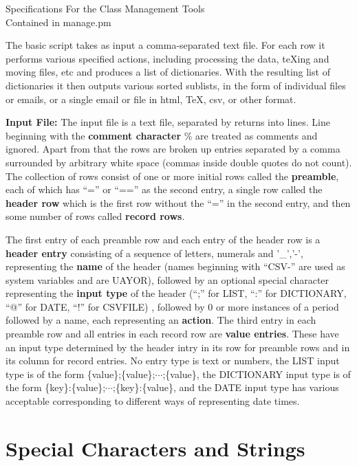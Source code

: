 \documentclass{article}
\begin{document}
{ \begin{centering}\Large
Specifications For the Class Management Tools \\ Contained in manage.pm
\end{centering}
}

The basic script takes as input a comma-separated text file.  For each
row it performs various specified actions, including processing the
data, teXing and moving files, etc and produces a list of dictionaries.  With the
resulting list of dictionaries it then outputs various sorted sublists, in
the form of individual files or emails, or a single email or file in
html, TeX, csv, or other format.  

\textbf{Input File:} The input file is a text file, separated by
returns into lines.  Line beginning with the \textbf{comment
  character} \% are treated as comments and ignored.  Apart from that
the rows are broken up entries separated by a comma surrounded by
arbitrary white space (commas inside  double quotes do not
count).  The collection of rows consist of one or more initial rows
called the \textbf{preamble}, each of which has ``='' or ``=='' as the second entry,
a single row called the \textbf{header row} which is the first row
without the ``='' in the second entry, and then some number of rows
called \textbf{record rows}.

The first entry of each preamble row and each entry of the header row
is a \textbf{header entry} consisting of a sequence of letters,
numerals and '\_','-', representing the \textbf{name} of the header
(names beginning with ``CSV-'' are used as system variables and are UAYOR), followed by an
optional special character representing the \textbf{input type} of
the header (``;'' for  LIST, ``:'' for DICTIONARY,  ``@'' for DATE,  ``!'' for CSVFILE) , followed by $0$ or
more instances of a period followed  by a name, each
representing an \textbf{action}.  The third entry in each preamble row
and all entries in each record row are \textbf{value entries}.  These
have an input type determined by the header intry in its row for
preamble rows and in its column for record entries.  No entry type is
text or numbers, the LIST input type is of the form
\{value\};\{value\};$\cdots$;\{value\}, the DICTIONARY input type is of the form
\{key\}:\{value\};$\cdots$;\{key\}:\{value\}, and the DATE input type has
various acceptable corresponding to different ways of representing
date times.
\section*{Special Characters and Strings}
\end{document}
